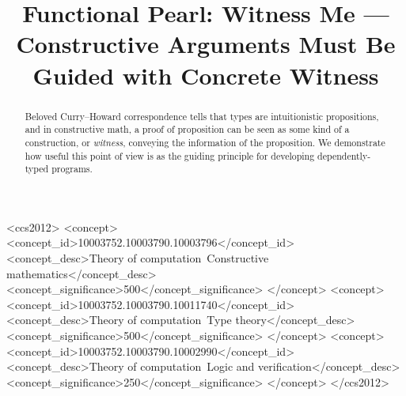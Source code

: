 \documentclass[sigplan,review]{acmart}
\begin{document}
\title[Functional Pearl: Witness Me]{Functional Pearl: Witness Me --- Constructive Arguments Must Be Guided with Concrete Witness}



\begin{abstract}
  
\end{abstract}

\begin{CCSXML}
<ccs2012>
   <concept>
       <concept_id>10003752.10003790.10003796</concept_id>
       <concept_desc>Theory of computation~Constructive mathematics</concept_desc>
       <concept_significance>500</concept_significance>
       </concept>
   <concept>
       <concept_id>10003752.10003790.10011740</concept_id>
       <concept_desc>Theory of computation~Type theory</concept_desc>
       <concept_significance>500</concept_significance>
       </concept>
   <concept>
       <concept_id>10003752.10003790.10002990</concept_id>
       <concept_desc>Theory of computation~Logic and verification</concept_desc>
       <concept_significance>250</concept_significance>
       </concept>
 </ccs2012>
\end{CCSXML}




\begin{abstract}
  Beloved Curry--Howard correspondence tells that types are intuitionistic propositions, and in constructive math, a proof of proposition can be seen as some kind of a construction, or \emph{witness}, conveying the information of the proposition.
  We demonstrate how useful this point of view is as the guiding principle for developing dependently-typed programs.
\end{abstract}
\end{document}
